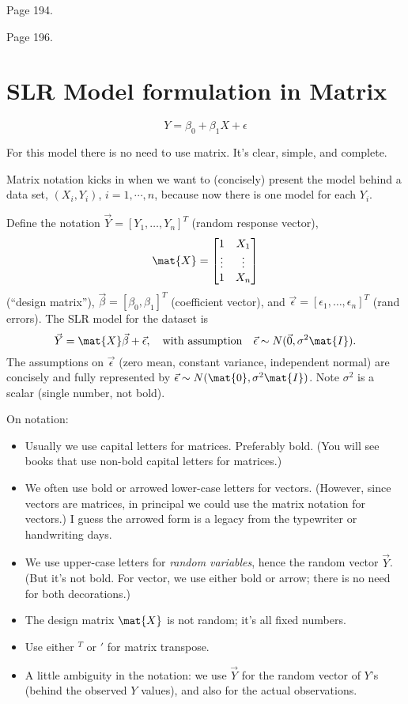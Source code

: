 \documentclass[12pt]{article}
\begin{document}
\example Page 194.

\example Page 196.

\section{SLR Model formulation in Matrix}

\[
Y = \beta_0 + \beta_1 X + \epsilon
\]

For this model there is no need to use matrix.
It's clear, simple, and complete.

Matrix notation kicks in when we want to (concisely) present
the model behind a data set, $(X_i, Y_i)$, $i=1,\dotsb,n$,
because now there is one model for each $Y_i$.

Define the notation
$\vec{Y} = [Y_1,\dotsc,Y_n]^T$
(random response vector),
\[
\mat{X} =
\begin{bmatrix}
    1 & X_1\\
    \vdots & \vdots\\
    1 & X_n
\end{bmatrix}
\]
(``design matrix''),
$\vec{\beta} = [\beta_0, \beta_1]^T$
(coefficient vector),
and
$\vec{\epsilon} = [\epsilon_1,\dotsc,\epsilon_n]^T$
(rand errors).
The SLR model for the dataset is
\[
\vec{Y} = \mat{X}\vec{\beta} + \vec{\epsilon},
\quad\text{with assumption}\quad
\vec{\epsilon} \sim N(\vec{0}, \sigma^2\mat{I})
.
\]
The assumptions on $\vec{\epsilon}$ (zero mean, constant variance,
independent normal) are concisely and fully represented by
$
\vec{\epsilon} \sim N(\mat{0}, \sigma^2\mat{I})
$.
Note $\sigma^2$ is a scalar (single number, not bold).

\note On notation:
\begin{itemize}
\item Usually we use capital letters for matrices.
Preferably bold. (You will see books that use non-bold capital letters
for matrices.)
\item We often use bold or arrowed lower-case letters for vectors.
(However, since vectors are matrices, in principal we could use the
matrix notation for vectors.) I guess the arrowed form is a legacy from
the typewriter or handwriting days.
\item We use upper-case letters for \emph{random variables},
hence the random vector $\vec{Y}$.
(But it's not bold. For vector, we use either bold or arrow;
there is no need for both decorations.)
\item The design matrix $\mat{X}$ is not random; it's all fixed numbers.
\item Use either $^T$ or $'$ for matrix transpose.
\item A little ambiguity in the notation:
we use $\vec{Y}$ for the random vector of $Y$'s (behind the observed $Y$
values), and also for the actual observations.
\end{itemize}
\end{document}
